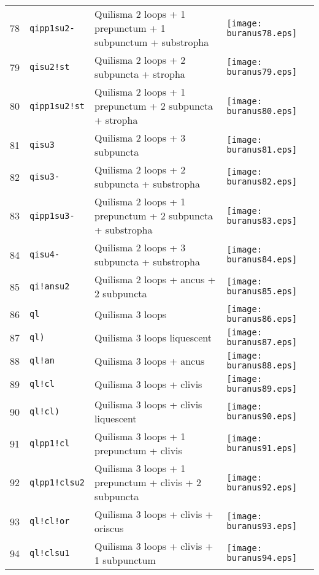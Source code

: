 \documentclass{scrarticle}
\begin{document}
\begin{longtable}{l|l|l|l}
78 & \texttt{qipp1su2-} & Quilisma 2 loops + 1 prepunctum + 1 subpunctum + substropha & \texttt{[image: buranus78.eps]} \\
79 & \texttt{qisu2!st} & Quilisma 2 loops + 2 subpuncta + stropha & \texttt{[image: buranus79.eps]} \\
80 & \texttt{qipp1su2!st} & Quilisma 2 loops + 1 prepunctum + 2 subpuncta + stropha & \texttt{[image: buranus80.eps]} \\
81 & \texttt{qisu3} & Quilisma 2 loops + 3 subpuncta & \texttt{[image: buranus81.eps]} \\
82 & \texttt{qisu3-} & Quilisma 2 loops + 2 subpuncta + substropha & \texttt{[image: buranus82.eps]} \\
83 & \texttt{qipp1su3-} & Quilisma 2 loops + 1 prepunctum + 2 subpuncta + substropha & \texttt{[image: buranus83.eps]} \\
84 & \texttt{qisu4-} & Quilisma 2 loops + 3 subpuncta + substropha & \texttt{[image: buranus84.eps]} \\
85 & \texttt{qi!ansu2} & Quilisma 2 loops + ancus + 2 subpuncta & \texttt{[image: buranus85.eps]} \\
86 & \texttt{ql} & Quilisma 3 loops & \texttt{[image: buranus86.eps]} \\
87 & \texttt{ql)} & Quilisma 3 loops liquescent & \texttt{[image: buranus87.eps]} \\
88 & \texttt{ql!an} & Quilisma 3 loops + ancus & \texttt{[image: buranus88.eps]} \\
89 & \texttt{ql!cl} & Quilisma 3 loops + clivis & \texttt{[image: buranus89.eps]} \\
90 & \texttt{ql!cl)} & Quilisma 3 loops + clivis liquescent & \texttt{[image: buranus90.eps]} \\
91 & \texttt{qlpp1!cl} & Quilisma 3 loops + 1 prepunctum + clivis & \texttt{[image: buranus91.eps]} \\
92 & \texttt{qlpp1!clsu2} & Quilisma 3 loops + 1 prepunctum + clivis + 2 subpuncta & \texttt{[image: buranus92.eps]} \\
93 & \texttt{ql!cl!or} & Quilisma 3 loops + clivis + oriscus & \texttt{[image: buranus93.eps]} \\
94 & \texttt{ql!clsu1} & Quilisma 3 loops + clivis + 1 subpunctum & \texttt{[image: buranus94.eps]} \\

\end{longtable}
\end{document}
